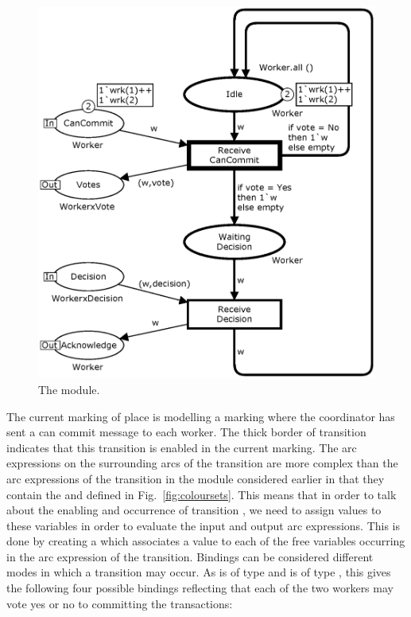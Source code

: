 \begin{figure}[]
\centering
\includegraphics[scale=.5]{figures/Workers.eps}
\caption{The  module.}
\label{fig:worker}
\end{figure}

The current marking of place  is  modelling a marking where the coordinator has sent a
can commit message to each worker. The thick border of transition
 indicates that this transition is enabled
in the current marking. The arc expressions on the surrounding arcs of
the  transition are more complex than the
arc expressions of the  transition in the
 module considered earlier in that they contain
the   and  defined in
Fig.~\ref{fig:coloursets}. This means that in order to talk about the
enabling and occurrence of transition , we
need to assign values to these variables in order to evaluate the
input and output arc expressions. This is done by creating a
 which associates a value to each of the free
variables occurring in the arc expression of the transition. Bindings
can be considered different modes in which a transition may occur.  As
 is of type  and  is of type
, this gives the following four possible bindings
reflecting that each of the two workers may vote yes or no to
committing the transactions:

